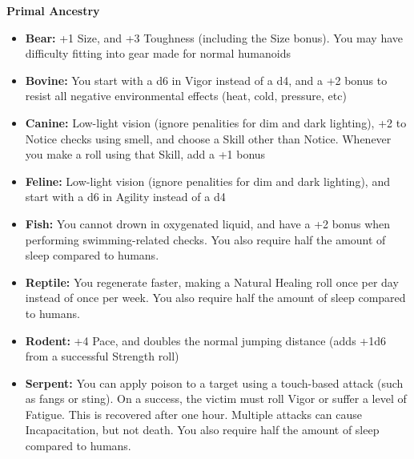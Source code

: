 \textbf{Primal Ancestry}
\begin{itemize}
    \item \textbf{Bear:} +1 Size, and +3 Toughness (including the Size bonus). You may have difficulty fitting into gear made for normal humanoids
    \item \textbf{Bovine:} You start with a d6 in Vigor instead of a d4, and a +2 bonus to resist all negative environmental effects (heat, cold, pressure, etc)
    \item \textbf{Canine:} Low-light vision (ignore penalities for dim and dark lighting), +2 to Notice checks using smell, and choose a Skill other than Notice. Whenever you make a roll using that Skill, add a +1 bonus
    \item \textbf{Feline:} Low-light vision (ignore penalities for dim and dark lighting), and start with a d6 in Agility instead of a d4
    \item \textbf{Fish:} You cannot drown in oxygenated liquid, and have a +2 bonus when performing swimming-related checks. You also require half the amount of sleep compared to humans.
    \item \textbf{Reptile:} You regenerate faster, making a Natural Healing roll once per day instead of once per week. You also require half the amount of sleep compared to humans.
    \item \textbf{Rodent:} +4 Pace, and doubles the normal jumping distance (adds +1d6 from a successful Strength roll)
    \item \textbf{Serpent:} You can apply poison to a target using a touch-based attack (such as fangs or sting). On a success, the victim must roll Vigor or suffer a level of Fatigue. This is recovered after one hour. Multiple attacks can cause Incapacitation, but not death. You also require half the amount of sleep compared to humans.
\end{itemize} 

